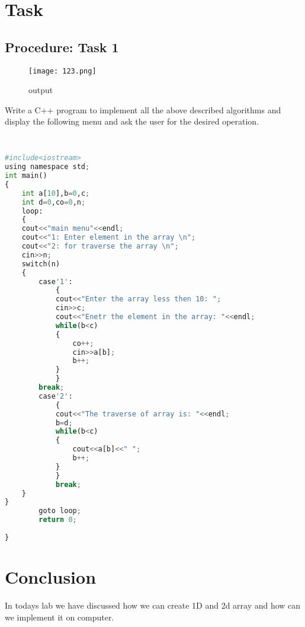 \documentclass[11pt]{article}            %
\begin{document}
\section{Task}  
\subsection{Procedure: Task 1 }     

\begin{figure*}
\centering
  \texttt{[image: 123.png]}
\caption{output}
\label{Figure:3}    
\end{figure*}
Write a C++ program to implement all the above described algorithms and display the following menu and ask the user for the desired operation.

\subsection{ }     

\begin{lstlisting}[language=Python]
 
#include<iostream>
using namespace std;
int main()
{
	int a[10],b=0,c;
	int d=0,co=0,n;
	loop:
	{
	cout<<"main menu"<<endl;
	cout<<"1: Enter element in the array \n";
	cout<<"2: for traverse the array \n";
	cin>>n;
	switch(n)
	{
		case'1':
			{
			cout<<"Enter the array less then 10: ";
			cin>>c;
			cout<<"Enetr the element in the array: "<<endl;
			while(b<c)
			{
				co++;
				cin>>a[b];
				b++;
			}
			}
		break;
		case'2':
			{
			cout<<"The traverse of array is: "<<endl;
			b=d;
			while(b<c)
			{
				cout<<a[b]<<" ";
				b++;
			}
			}
			break;
	}
}
		goto loop;
		return 0;
		
}
\end{lstlisting}

\section{Conclusion}  
In todays lab we have discussed how we  can create 1D and 2d array and how can we implement it on computer.

 
\end{document}
